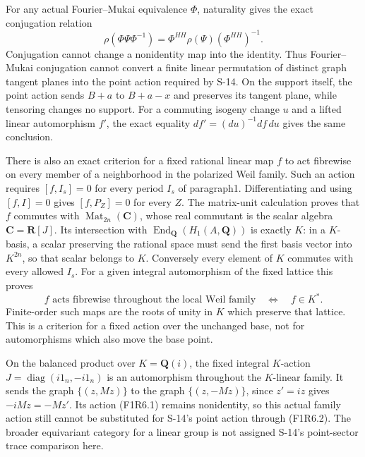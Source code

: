 For any actual Fourier--Mukai equivalence $\Phi$, naturality
gives the exact conjugation relation
\[
 \rho(\Phi\Psi\Phi^{-1})
       =\Phi^{HH}\rho(\Psi)(\Phi^{HH})^{-1}.
 \tag{F1R6.2}
\]
Conjugation cannot change a nonidentity map into the identity.
Thus Fourier--Mukai conjugation cannot convert a finite
linear permutation of distinct graph tangent planes into
the point action required by S-14. On the support itself,
the point action sends $B+a$ to $B+a-x$ and preserves its
tangent plane, while tensoring changes no support.
For a commuting isogeny change $u$ and a lifted linear
automorphism $f'$, the exact equality
$df'=(du)^{-1}df\,du$ gives the same conclusion.

There is also an exact criterion for a fixed rational linear
map $f$ to act fibrewise on every member of a neighborhood
in the polarized Weil family. Such an action requires
$[f,I_s]=0$ for every period $I_s$ of paragraph1. Differentiating
and using $[f,I]=0$ gives $[f,P_Z]=0$ for every $Z$.
The matrix-unit calculation proves that $f$ commutes with
$\operatorname{Mat}_{2n}(\mathbf C)$, whose real commutant is
the scalar algebra $\mathbf C=\mathbf R[J]$. Its intersection
with $\operatorname{End}_{\mathbf Q}(H_1(A,\mathbf Q))$ is
exactly $K$: in a $K$-basis, a scalar preserving the rational
space must send the first basis vector into $K^{2n}$, so that
scalar belongs to $K$. Conversely every element of $K$
commutes with every allowed $I_s$. For a given integral
automorphism of the fixed lattice this proves
\[
 f\text{ acts fibrewise throughout the local Weil family}
                  \quad\Longleftrightarrow\quad f\in K^*.
 \tag{F1R6.3}
\]
Finite-order such maps are the roots of unity in $K$ which
preserve that lattice. This is a criterion for a fixed action
over the unchanged base, not for automorphisms which also
move the base point.

On the balanced product over
$K=\mathbf Q(i)$, the fixed integral $K$-action
$J=\operatorname{diag}(i1_n,-i1_n)$ is an automorphism
throughout the $K$-linear family. It sends the graph
$\{(z,Mz)\}$ to the graph $\{(z,-Mz)\}$, since
$z'=iz$ gives $-iMz=-Mz'$. Its action (F1R6.1) remains
nonidentity, so this actual family action still cannot
be substituted for S-14's point action through (F1R6.2).
The broader equivariant category for a linear group is
not assigned S-14's point-sector trace comparison here.

